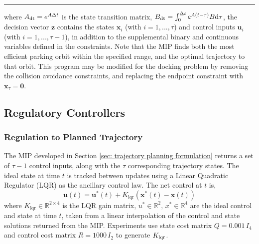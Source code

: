 \documentclass[twocolumn,letterpaper]{IEEEAerospaceCLS}  %
\theoremstyle{definition}
\begin{document}
\noindent \rule[7pt]{1\columnwidth}{0.7pt}
where $A_{\rm dt}=e^{A \Delta t}$ is the state transition matrix, $B_{\rm dt} = \int_0^{\Delta t}e^{A(t-\tau)}B{\rm d}\tau $, the decision vector $\boldsymbol{z}$ contains the states $\boldsymbol{x}_i$ (with $i=1,...,\tau$) and control inputs $\boldsymbol{u}_i$ (with $i=1,...,\tau-1$), in addition to the supplemental binary and continuous variables defined in the constraints. 
Note that the MIP finds both the most efficient parking orbit within the specified range, and the optimal trajectory to that orbit. 
This program may be modified for the docking problem by removing the collision avoidance constraints, and replacing the endpoint constraint with $\boldsymbol{x}_\tau = \boldsymbol{0}$.



\subsection{Regulatory Controllers} \label{sec: regulatory controllers}
\subsubsection{Regulation to Planned Trajectory} \label{sec: reg to planned trajectories}
The MIP developed in Section \ref{sec: trajectory planning formulation} returns a set of $\tau-1$ control inputs, along with the $\tau$ corresponding trajectory states. 
The ideal state at time $t$ is tracked between updates using a Linear Quadratic Regulator (LQR) as the ancillary control law. The net control at $t$ is, 
\begin{equation} \label{eq: regulate to traj controller}
  \boldsymbol{u}(t) = \boldsymbol{u}^*(t) + K_{\textrm{lqr}} ( \boldsymbol{x}^*(t) -\boldsymbol{x}(t)) 
\end{equation}
where
$K_{\textrm{lqr}} \in {\mathbb R}^{2\times 4}$ 
is the LQR gain matrix, $u^*\in{\mathbb R}^2,\,x^*\in{\mathbb R}^4$ are the ideal control and state at time $t$, taken from a linear interpolation of the control and state solutions returned from the MIP. 
Experiments use state cost matrix $Q=0.001\,I_4$ and control cost matrix $R=1000\, I_2 $ to generate $K_{\rm lqr}$. 
\end{document}
